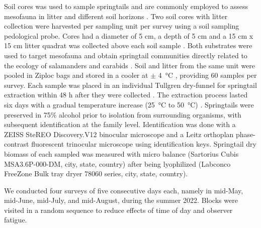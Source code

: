 Soil cores was used to sample springtails and are commonly employed to assess mesofauna in litter and different soil horizons \citep{chauvatChangesSoilFaunal2011a,farskaManagementIntensityAffects2014,pongeVerticalDistributionCollembola2000,salamonEffectsPlantDiversity2004,wuCompositionSpatiotemporalVariation2014}. 
Two soil cores with litter collection were harvested per sampling unit per survey using a soil sampling pedological probe. 
Cores had a diameter of 5 cm, a depth of 5 cm and a 15 cm x 15 cm litter quadrat was collected above each soil sample \citep{raymond-leonardSpringtailCommunityStructure2018a,rousseauForestFloorMesofauna2018}.
Both substrates were used to target mesofauna and obtain springtail communities directly related to the ecology of salamanders and carabids \citep{chauvatChangesSoilFaunal2011a,edwardsAssessmentPopulationsSoilinhabiting1991,raymond-leonardSpringtailCommunityStructure2018a,rousseauForestFloorMesofauna2018}.
Soil and litter from the same unit were pooled in Ziploc\up{\texttrademark{}} bags and stored in a cooler at $\pm$ 4 °C \citep{chauvatChangesSoilFaunal2011a,rousseauForestFloorMesofauna2018}, providing 60 samples per survey.
Each sample was placed in an individual Tullgren dry-funnel for springtail extraction within 48 h after they were collected \citep{rousseauForestFloorMesofauna2018,rusekBiodiversityCollembolaTheir1998,wuCompositionSpatiotemporalVariation2014}. 
The extraction process lasted six days with a gradual temperature increase (25 °C to 50 °C) \citep{raymond-leonardSpringtailCommunityStructure2018a}.
Springtails were preserved in 75\% alcohol \citep{wuCompositionSpatiotemporalVariation2014} prior to isolation from surrounding organisms, with subsequent identification at the family level.
Identification was done with a ZEISS SteREO Discovery.V12 binocular microscope and a Leitz orthoplan phase-contrast fluorescent trinocular microscope using \cite{bellingerChecklistCollembolaWorld1996} identification keys.
Springtail dry biomass of each sampled was measured with micro balance (Sartorius Cubis\up{\texttrademark{}} MSA3.6P-000-DM, city, state, country) after being lyophilized (Labconco FreeZone Bulk tray dryer 78060 series, city, state, country).

We conducted four surveys of five consecutive days each, namely in mid-May, mid-June, mid-July, and mid-August, during the summer 2022.
Blocks were visited in a random sequence to reduce effects of time of day and observer fatigue.

\pagebreak

